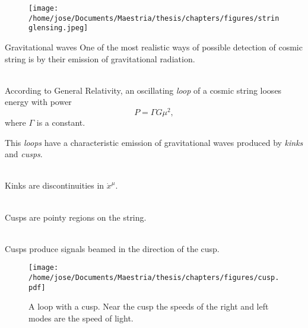 \documentclass[14pt]{beamer}
\begin{document}
\begin{frame}
\begin{figure}
	\centering
	\texttt{[image: /home/jose/Documents/Maestria/thesis/chapters/figures/stringlensing.jpeg]}
\end{figure} 
\end{frame}


\begin{frame}{Gravitational waves}
One of the most realistic ways of possible detection of cosmic string is by their emission of gravitational radiation.\\~\

According to General Relativity, an oscillating \textit{loop} of a cosmic string looses energy with power
\begin{equation*}
	P = \Gamma G \mu^2,
\end{equation*}
where $\Gamma$ is a constant.
\end{frame}

\begin{frame}

	This \textit{loops} have a characteristic emission of gravitational waves produced by \textit{kinks} and \textit{cusps}.\\~\

	Kinks are discontinuities in $\dot x^{\mu}$. \\~\

	Cusps are pointy regions on the string.\\~\
	
	Cusps produce signals beamed in the direction of the cusp.
	
\end{frame}

\begin{frame}
	\begin{figure}
	\centering
	\texttt{[image: /home/jose/Documents/Maestria/thesis/chapters/figures/cusp.pdf]}
	\caption{A loop with a cusp. Near the cusp the speeds of the right and left modes are the speed of light.}
		\label{fig:cusp}
\end{figure}
\end{frame}
\end{document}
